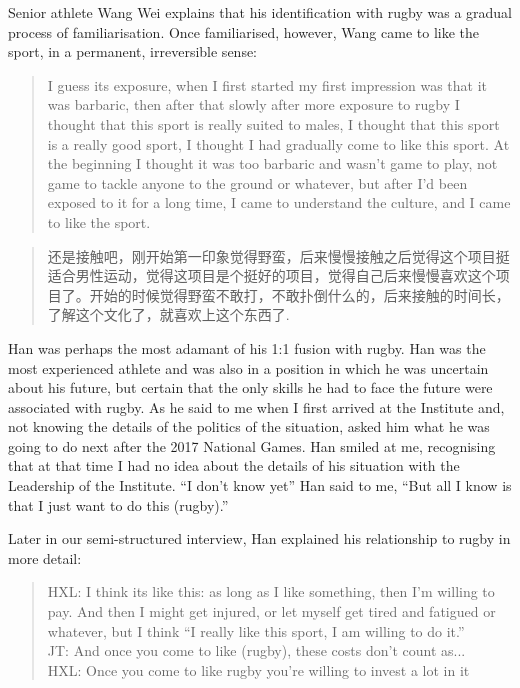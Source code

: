 \begin{CJK}{UTF8}{gbsn}
Senior athlete Wang Wei explains that his identification with rugby was a gradual process of familiarisation. Once familiarised, however, Wang came to like the sport, in a permanent, irreversible sense:

  \begin{quotation}
    I guess its exposure, when I first started my first impression was that it was barbaric, then after that slowly after more exposure to rugby I thought that this sport is really suited to males, I thought that this sport is a really good sport, I thought I had gradually come to like this sport.  At the beginning I thought it was too barbaric and wasn’t game to play, not game to tackle anyone to the ground or whatever, but after I’d been exposed to it for a long time, I came to understand the culture, and I came to like the sport.
  \end{quotation}

  \begin{quotation}
    还是接触吧，刚开始第一印象觉得野蛮，后来慢慢接触之后觉得这个项目挺适合男性运动，觉得这项目是个挺好的项目，觉得自己后来慢慢喜欢这个项目了。开始的时候觉得野蛮不敢打，不敢扑倒什么的，后来接触的时间长，了解这个文化了，就喜欢上这个东西了.
  \end{quotation}


Han was perhaps the most adamant of his 1:1 fusion with rugby.  Han was the most experienced athlete and was also in a position in which he was uncertain about his future, but certain that the only skills he had to face the future were associated with rugby.  As he said to me when I first arrived at the Institute and, not knowing the details of the politics of the situation, asked him what he was going to do next after the 2017 National Games.  Han smiled at me, recognising that at that time I had no idea about the details of his situation with the Leadership of the Institute. ``I don't know yet'' Han said to me, ``But all I know is that I just want to do this (rugby).''

Later in our semi-structured interview, Han explained his relationship to rugby in more detail:

    \begin{quotation}
      HXL: I think its like this: as long as I like something, then I’m willing to pay.  And then I might get injured, or let myself get tired and fatigued or whatever, but I think ``I really like this sport, I am willing to do it.''\\
      JT: And once you come to like (rugby), these costs don't count as...\\
      HXL: Once you come to like rugby you're willing to invest a lot in it
    \end{quotation}


\end{CJK}
